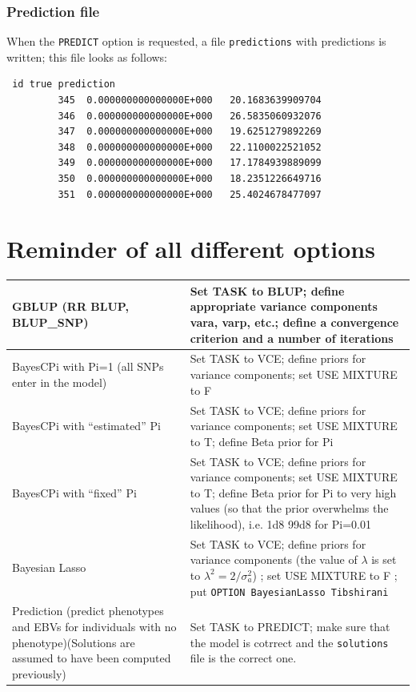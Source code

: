 \documentclass[a4paper,12pt,titlepage]{article}      %
\begin{document}
\subsubsection{Prediction file}
When the \texttt{PREDICT} option is requested, a file \texttt{predictions} with predictions is written; this file looks as follows:
\begin{verbatim}
 id true prediction
         345  0.000000000000000E+000   20.1683639909704
         346  0.000000000000000E+000   26.5835060932076
         347  0.000000000000000E+000   19.6251279892269
         348  0.000000000000000E+000   22.1100022521052
         349  0.000000000000000E+000   17.1784939889099
         350  0.000000000000000E+000   18.2351226649716
         351  0.000000000000000E+000   25.4024678477097
 \end{verbatim}



\section{Reminder of all different options}
\begin{tabular}[c]{ p{5 cm} | p{7 cm} }
\hline
	GBLUP (RR BLUP, BLUP\_SNP)  &  Set TASK to BLUP; define appropriate variance components vara, varp, etc.; define a convergence criterion and a number of iterations \\
\hline
	BayesCPi with Pi=1 (all SNPs enter in the model) & Set TASK to VCE; define priors for variance components; set USE MIXTURE to F \\
\hline
	BayesCPi with ``estimated'' Pi & Set TASK to VCE; define priors for variance components; set USE MIXTURE to T; define Beta prior for Pi \\
\hline
	BayesCPi with ``fixed'' Pi & Set TASK to VCE; define priors for variance components; set USE MIXTURE to T; define Beta prior for Pi to very high values (so that the prior overwhelms the likelihood), i.e. 1d8 99d8 for Pi=0.01 \\
\hline
	Bayesian Lasso & Set TASK to VCE; define priors for variance components 
(the value of $\lambda$ is set to $\lambda^2=2/\sigma^2_a$) ; set USE MIXTURE to F ; put \verb|OPTION BayesianLasso Tibshirani| \\
\hline
	Prediction (predict phenotypes and EBVs for individuals with no phenotype)(Solutions are assumed to have been computed previously) & Set TASK to PREDICT; make sure that the model is cotrrect and the \verb|solutions| file is the correct one. \\
\hline
\end{tabular}



\end{document}

